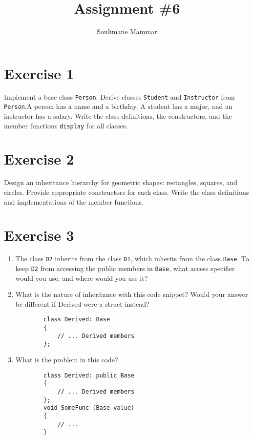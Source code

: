 \documentclass[10pt,a4paper]{article}
\title{Assignment \#6}
\author{Soulimane Mammar}
\begin{document}
	\maketitle
    \section*{Exercise 1}
    Implement a base class \verb|Person|. Derive classes \verb|Student| and \verb|Instructor| from \verb|Person|.A person has a name and a birthday. A student has a major, and an instructor has a salary. Write the class definitions, the constructors, and the member functions \verb|display| for all classes.
    
    \section*{Exercise 2}
    Design an inheritance hierarchy for geometric shapes: rectangles, squares, and
    circles. Provide appropriate constructors for each class. Write the class definitions and implementations of the member functions.
    
    \section*{Exercise 3}
    \begin{enumerate}
    	\item The class \verb|D2| inherits from the class \verb|D1|, which inherits from the class \verb|Base|. To keep \verb|D2| from accessing the public members in \verb|Base|, what access specifier would you use, and where would you use it?
    	\item What is the nature of inheritance with this code snippet? Would your answer be different if Derived were a struct instead?
    	\begin{verbatim}
    	class Derived: Base
    	{
    	    // ... Derived members
    	};	
    	\end{verbatim}
    	\item What is the problem in this code?
    	\begin{verbatim}
    	class Derived: public Base
    	{
    	    // ... Derived members
    	};
    	void SomeFunc (Base value)
    	{
    	    // ...
    	}
    	\end{verbatim}
    \end{enumerate}
    
\end{document}
